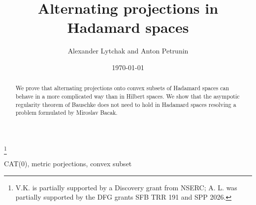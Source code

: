 \documentclass[12pt,leqno]{amsart}
\numberwithin{equation}{section}
\theoremstyle{remark}
\begin{document}
	\pagebreak
	
	
	\title{Alternating projections in Hadamard spaces}
	
	
	\thanks{V.K.  is partially supported by a Discovery grant from NSERC;
		A. L. was partially supported by the DFG grants   SFB TRR 191 and SPP 2026.}

	
	\author{Alexander Lytchak and Anton Petrunin}
	
	
	\keywords
	{CAT(0), metric porjections, convex subset}
	
	
	\date{\today}
	
	
	
	\begin{abstract}
		We  prove that  alternating projections onto convex subsets of Hadamard spaces can behave in a more complicated way than in Hilbert spaces. We show that the asympotic regularity theorem of Bauschke does not need to hold in Hadamard spaces resolving a problem formulated by Miroslav Bacak. 
	\end{abstract}
	
	
	
	
	
	
	
	
	\maketitle


\end{document}
